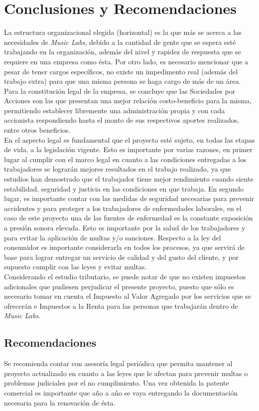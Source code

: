 \section{Conclusiones y Recomendaciones}
La estructura organizacional elegida (horizontal) es la que más se acerca a las 
necesidades de \emph{Music Labs}, debido a la cantidad de gente que se espera esté
trabajando en la organización, además del nivel y rapidez de respuesta que se 
requiere en una empresa como ésta. Por otro lado, es necesario mencionar que 
a pesar de tener cargos específicos, no existe un impedimento real (además del 
trabajo extra) para que una misma persona se haga cargo de más de un área.\\

Para la constitución legal de la empresa, se concluye que las Sociedades por
Acciones son las que presentan una mejor relación costo-beneficio para la misma,
permitiendo establecer libremente una administración propia y con cada
accionista respondiendo hasta el monto de sus respectivos aportes realizados,
entre otros beneficios.\\

En el aspecto legal es fundamental que el proyecto esté sujeto, en todas las
etapas de vida, a la legislación vigente. Esto es importante por varias 
razones, en primer lugar al cumplir con el marco legal en cuanto a las condiciones
entregadas a los trabajadores se lograrán mejores resultados en el trabajo
realizado, ya que estudios han demostrado que el trabajador tiene mejor rendimiento
cuando siente estabilidad, seguridad y justicia en las condiciones en que trabaja.
En segundo lugar, es importante contar con las medidas de seguridad necesarias para
prevenir accidentes y para proteger a los trabajadores de enfermedades laborales, 
en el caso de este proyecto una de las fuentes de enfermedad es la constante
exposición a presión sonora elevada. Esto es importante por la salud de los
trabajadores y para evitar la aplicación de multas y/o sanciones.
Respecto a la ley del consumidor es importante considerarla en todos los procesos, ya 
que servirá de base para lograr entregar un servicio de calidad y del gusto del cliente, 
y por supuesto cumplir con las leyes y evitar multas.\\

Considerando el estudio tributario, se puede notar de que no existen impuestos
adicionales que pudiesen perjudicar el presente proyecto, puesto que sólo
es necesario tomar en cuenta el Impuesto al Valor Agregado por los servicios
que se ofrecerán e Impuestos a la Renta para las personas que trabajarán
dentro de \emph{Music Labs}. 

\subsection*{Recomendaciones}
Se recomienda contar con asesoría legal periódica que permita mantener
al proyecto actualizado en cuanto a las leyes que le afectan para prevenir
multas o problemas judiciales por el no cumplimiento. Una vez obtenida la
patente comercial es importante que año a año se vaya entregando la
documentación necesaria para la renovación de ésta.

